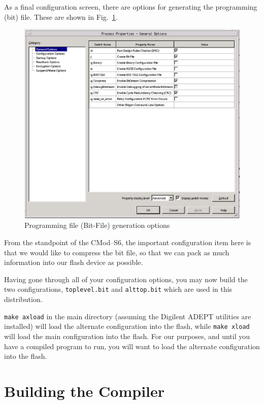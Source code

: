 \documentclass{gqtekspec}
\begin{document}
As a final configuration screen, there are options for generating the
programming (bit) file.  These are shown in Fig.~\ref{fig:bitfopts}.
\begin{figure}
\begin{center}
\includegraphics[width=6in]{../gfx/bitfopts.eps}
\caption{Programming file (Bit-File) generation options}\label{fig:bitfopts}
\end{center}\end{figure}
From the standpoint of the CMod--S6, the important configuration item here is
that we would like to compress the bit file, so that we can pack as much
information into our flash device as possible.

Having gone through all of your configuration options, you may now build the
two configurations, {\tt toplevel.bit} and {\tt alttop.bit} which are used in
this distribution.

{\tt make axload} in the main directory (assuming the Digilent ADEPT utilities
are installed) will load the alternate configuration into the flash, while
{\tt make xload} will load the main configuration into the flash.  For our
purposes, and until you have a compiled program to run, you will want to load
the alternate configuration into the flash.

\section{Building the Compiler}
\end{document}
